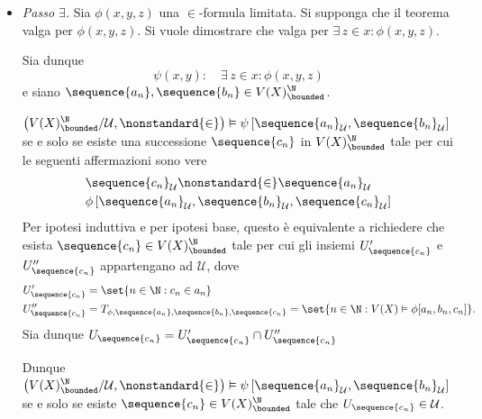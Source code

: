 {\begin{itemize}
        Poiché $ \mathcal{U} $ è un ultrafiltro allora è primo, e quindi la condizione di cui sopra è equivalente a $ T_{\phi, \sequence{a_{n} }}  \cup T_{\psi, \sequence{a_{n} }}  \in \mathcal{U} $. La tesi segue dal fatto che \begin{equation*}
            T_{\phi, \sequence{a_{n} }}  \cup T_{\psi, \sequence{a_{n} }} = T_{\phi\lor\psi, \sequence{a_{n} }}. 
        \end{equation*}
        \item \textit{Passo $ \exists $.} Sia $ \phi(x,y,z) $ una $ \in $-formula limitata. Si supponga che il teorema valga per $ \phi(x,y,z) $. Si vuole dimostrare che valga per $ \exists\,z \in x: \phi(x,y,z) $.
        
        Sia dunque \begin{equation*}
            \psi(x,y): \quad \exists\,z \in x: \phi(x,y,z)
        \end{equation*}e siano $ \sequence{a_{n} }, \sequence{b_{n} } \in V(X)^{\N}_{\bounded}$. 

        $\left(V(X)^{\N}_{\bounded}/\mathcal{U}, \nonstandard{\in}\right)\vDash\psi\left[\sequence{a_{n} }_{\mathcal{U}},\sequence{b_{n} }_{\mathcal{U}}\right]  $ se e solo se esiste una successione $ \sequence{c_{n}} $ in $ V(X)^{\N}_{\bounded} $ tale per cui le seguenti affermazioni sono vere \begin{align*}
            &\sequence{c_{n}}_{\mathcal{U}} \mathcal{\nonstandard{\in}} \sequence{a_{n} }_{\mathcal{U}}\\
            &\phi\left[\sequence{a_{n} }_{\mathcal{U}},\sequence{b_{n} }_{\mathcal{U}},\sequence{c_{n} }_{\mathcal{U}}\right]
        \end{align*}Per ipotesi induttiva e per ipotesi base, questo è equivalente a richiedere che esista $ \sequence{c_{n} } \in V(X)^{\N}_{\bounded} $ tale per cui gli insiemi $ U_{\sequence{c_{n} }}'  $ e $ U_{\sequence{c_{n} }}'' $ appartengano ad $ \mathcal{U}  $, dove \begin{align*}
            U_{\sequence{c_{n} }}' &= \set{n \in \N: c_{n} \in a_{n}  }\\ 
            U_{\sequence{c_{n} }}'' &= T_{\phi, \sequence{a_{n} }, \sequence{b_{n} }, \sequence{c_{n} }} = \set{n \in \N: V(X)\vDash \phi[a_{n}, b_{n}, c_{n}   ]}. 
        \end{align*}Sia dunque $ U_{\sequence{c_{n} }} =  U_{\sequence{c_{n} }}'\cap U_{\sequence{c_{n} }}'' $

        Dunque $\left(V(X)^{\N}_{\bounded}/\mathcal{U}, \nonstandard{\in}\right)\vDash\psi\left[\sequence{a_{n} }_{\mathcal{U}},\sequence{b_{n} }_{\mathcal{U}}\right]  $ se e solo se esiste $ \sequence{c_{n} } \in V(X)^{\N}_{\bounded} $ tale che $ U_{\sequence{c_{n}}} \in \mathcal{U}$.


\end{itemize}}
